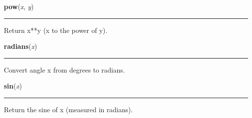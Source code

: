     \label{math:pow}

    \vspace{0.5ex}

\hspace{.8\funcindent}\begin{boxedminipage}{\funcwidth}

    \raggedright \textbf{pow}(\textit{x}, \textit{y})

    \vspace{-1.5ex}

    \rule{\textwidth}{0.5\fboxrule}
\setlength{\parskip}{2ex}
    Return x**y (x to the power of y).

\setlength{\parskip}{1ex}
    \end{boxedminipage}

    \label{math:radians}

    \vspace{0.5ex}

\hspace{.8\funcindent}\begin{boxedminipage}{\funcwidth}

    \raggedright \textbf{radians}(\textit{x})

    \vspace{-1.5ex}

    \rule{\textwidth}{0.5\fboxrule}
\setlength{\parskip}{2ex}
    Convert angle x from degrees to radians.

\setlength{\parskip}{1ex}
    \end{boxedminipage}

    \label{math:sin}

    \vspace{0.5ex}

\hspace{.8\funcindent}\begin{boxedminipage}{\funcwidth}

    \raggedright \textbf{sin}(\textit{x})

    \vspace{-1.5ex}

    \rule{\textwidth}{0.5\fboxrule}
\setlength{\parskip}{2ex}
    Return the sine of x (measured in radians).

\setlength{\parskip}{1ex}
    \end{boxedminipage}

    \label{math:sinh}

